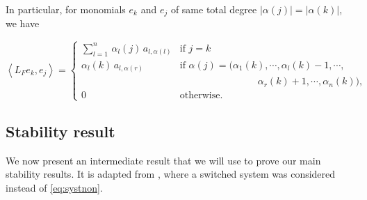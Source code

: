 \documentclass{article}
\begin{document}
In particular, for monomials $e_k$ and $e_j$ of same total degree $|\alpha(j)|=|\alpha(k)|$, we have 

{\small
\begin{equation}\label{eq:total_degree_bloc}
\left\langle L_Fe_{k},e_{j} \right\rangle =
\begin{cases}\sum_{l=1}^{n}\, \alpha_l(j) \, a_{l,\alpha(l)}& \textrm{if } j=k \\
\alpha_{l}(k) \, a_{l,\alpha(r)} & \textrm{if } \alpha(j)=(\alpha_1(k),\cdots, \alpha_{l}(k)-1, \cdots, \\
&\qquad \qquad \qquad \qquad  \alpha_{r}(k)+1, \cdots,\alpha_n(k)),
\\
0 &  \textrm{otherwise}.
\end{cases}
\end{equation}}



\subsection{Stability result}

We now present an intermediate result that we will use to prove our main stability results. It is adapted from \cite{CMZAM2}, where a switched system was considered instead of \eqref{eq:systnon}.
\end{document}
